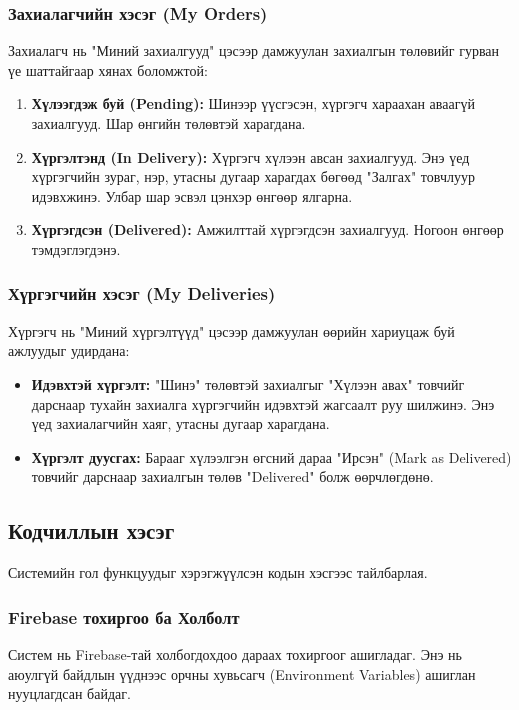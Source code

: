 \subsubsection{Захиалагчийн хэсэг (My Orders)}
Захиалагч нь "Миний захиалгууд" цэсээр дамжуулан захиалгын төлөвийг гурван үе шаттайгаар хянах боломжтой:
\begin{enumerate}
    \item \textbf{Хүлээгдэж буй (Pending):} Шинээр үүсгэсэн, хүргэгч хараахан аваагүй захиалгууд. Шар өнгийн төлөвтэй харагдана.
    \item \textbf{Хүргэлтэнд (In Delivery):} Хүргэгч хүлээн авсан захиалгууд. Энэ үед хүргэгчийн зураг, нэр, утасны дугаар харагдах бөгөөд "Залгах" товчлуур идэвхжинэ. Улбар шар эсвэл цэнхэр өнгөөр ялгарна.
    \item \textbf{Хүргэгдсэн (Delivered):} Амжилттай хүргэгдсэн захиалгууд. Ногоон өнгөөр тэмдэглэгдэнэ.
\end{enumerate}

\subsubsection{Хүргэгчийн хэсэг (My Deliveries)}
Хүргэгч нь "Миний хүргэлтүүд" цэсээр дамжуулан өөрийн хариуцаж буй ажлуудыг удирдана:
\begin{itemize}
    \item \textbf{Идэвхтэй хүргэлт:} "Шинэ" төлөвтэй захиалгыг "Хүлээн авах" товчийг дарснаар тухайн захиалга хүргэгчийн идэвхтэй жагсаалт руу шилжинэ. Энэ үед захиалагчийн хаяг, утасны дугаар харагдана.
    \item \textbf{Хүргэлт дуусгах:} Барааг хүлээлгэн өгсний дараа "Ирсэн" (Mark as Delivered) товчийг дарснаар захиалгын төлөв "Delivered" болж өөрчлөгдөнө.
\end{itemize}

\subsection{Кодчиллын хэсэг}
Системийн гол функцуудыг хэрэгжүүлсэн кодын хэсгээс тайлбарлая.

\subsubsection{Firebase тохиргоо ба Холболт}
Систем нь Firebase-тай холбогдохдоо дараах тохиргоог ашигладаг. Энэ нь аюулгүй байдлын үүднээс орчны хувьсагч (Environment Variables) ашиглан нууцлагдсан байдаг.

